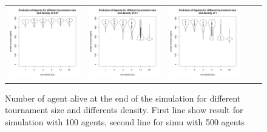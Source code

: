 \documentclass[a4paper]{article}
\begin{document}
\begin{figure}
\begin{tabular}[H]{lcccc}
	\includegraphics[width=.25\textwidth]{img/500/agentwrtK_D-0010.pdf} &
	\includegraphics[width=.25\textwidth]{img/500/agentwrtK_D-0100.pdf} &
	\includegraphics[width=.25\textwidth]{img/500/agentwrtK_D-1000.pdf} \\
    \end{tabular}
    \caption{Number of agent alive at the end of the simulation for different tournament size and differents density. First line show result for simulation with 100 agents, second line for simu with 500 agents }
\end{figure}

\pagebreak
\end{document}
